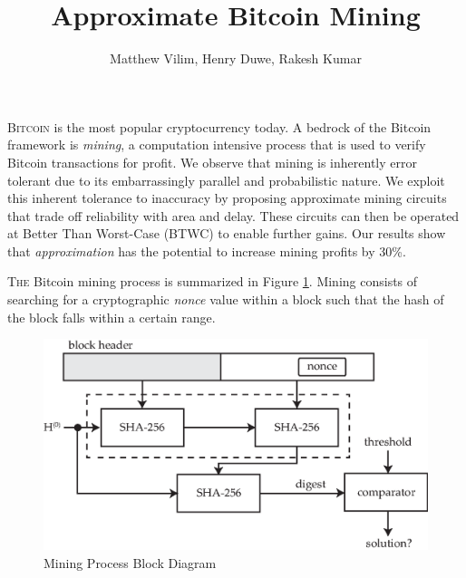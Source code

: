 \documentclass[portrait,a0,final]{a0poster}
\begin{document}
\setlength{\columnsep}{50pt}

\title{\veryHuge Approximate Bitcoin Mining}
\author{\Large Matthew Vilim, Henry Duwe, Rakesh Kumar}
\date{}
\maketitle

\begin{multicols}{3}

\begin{tcolorbox}[title=Abstract]
\lettrine{B}{itcoin} is the most popular cryptocurrency today. A bedrock of the Bitcoin framework is \emph{mining}, a computation intensive process that is used to verify Bitcoin transactions for profit. We observe that mining is inherently error tolerant due to its embarrassingly parallel and probabilistic nature. We exploit this inherent tolerance to inaccuracy by proposing approximate mining circuits that trade off reliability with area and delay. These circuits can then be operated at Better Than Worst-Case (BTWC) to enable further gains. Our results show that \emph{approximation} has the potential to increase mining profits by 30\%.
\end{tcolorbox}

\begin{tcolorbox}[title=Mining Background]
\lettrine{T}{he} Bitcoin mining process is summarized in Figure \ref{mining_process}. Mining consists of searching for a cryptographic \emph{nonce} value within a block such that the hash of the block falls within a certain range.
\end{tcolorbox}

\begin{figure}[H]
\caption{Mining Process Block Diagram}
\label{mining_process}
\centering
\includegraphics[width=0.8\linewidth]{mining_process}
\end{figure}


\end{multicols}
\end{document}
